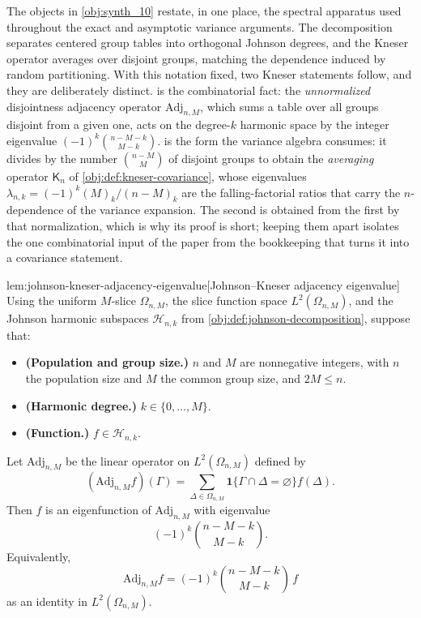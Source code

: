 The objects in \cref{obj:synth_10} restate, in one place, the spectral apparatus used throughout the exact and asymptotic variance arguments. The decomposition separates centered group tables into orthogonal Johnson degrees, and the Kneser operator averages over disjoint groups, matching the dependence induced by random partitioning. With this notation fixed, two Kneser statements follow, and they are deliberately distinct.  is the combinatorial fact: the \emph{unnormalized} disjointness adjacency operator \(\mathrm{Adj}_{n,M}\), which sums a table over all groups disjoint from a given one, acts on the degree-\(k\) harmonic space by the integer eigenvalue \((-1)^k\binom{n-M-k}{M-k}\).  is the form the variance algebra consumes: it divides by the number \(\binom{n-M}{M}\) of disjoint groups to obtain the \emph{averaging} operator \(\mathsf K_n\) of \cref{obj:def:kneser-covariance}, whose eigenvalues \(\lambda_{n,k}=(-1)^k(M)_k/(n-M)_k\) are the falling-factorial ratios that carry the \(n\)-dependence of the variance expansion. The second is obtained from the first by that normalization, which is why its proof is short; keeping them apart isolates the one combinatorial input of the paper from the bookkeeping that turns it into a covariance statement.

\begin{lemmav}{lem:johnson-kneser-adjacency-eigenvalue}[Johnson--Kneser adjacency eigenvalue]
Using the uniform \(M\)-slice \(\Omega_{n,M}\), the slice function space \(L^2(\Omega_{n,M})\), and the Johnson harmonic subspaces \(\mathcal H_{n,k}\) from \cref{obj:def:johnson-decomposition}, suppose that:
\begin{itemize}
\item \textbf{(Population and group size.)} \(n\) and \(M\) are nonnegative integers, with \(n\) the population size and \(M\) the common group size, and \(2M\le n\).
\item \textbf{(Harmonic degree.)} \(k\in\{0,\ldots,M\}\).
\item \textbf{(Function.)} \(f\in\mathcal H_{n,k}\).
\end{itemize}
Let \(\mathrm{Adj}_{n,M}\) be the linear operator on \(L^2(\Omega_{n,M})\) defined by
\[
(\mathrm{Adj}_{n,M}f)(\Gamma)
=
\sum_{\Delta\in\Omega_{n,M}}
\mathbf 1\{\Gamma\cap\Delta=\varnothing\}f(\Delta).
\]
Then \(f\) is an eigenfunction of \(\mathrm{Adj}_{n,M}\) with eigenvalue
\[
(-1)^k\binom{n-M-k}{M-k}.
\]
Equivalently,
\[
\mathrm{Adj}_{n,M}f
=
(-1)^k\binom{n-M-k}{M-k}\,f
\]
as an identity in \(L^2(\Omega_{n,M})\).
\end{lemmav}

